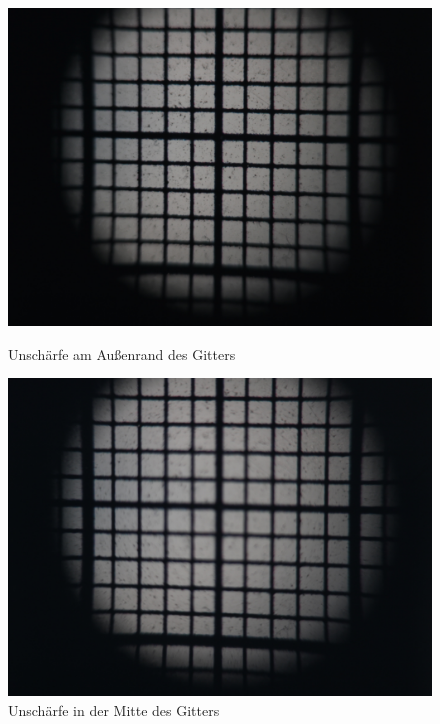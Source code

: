 \begin{figure}[h!]
	\begin{minipage}[t]{0.48\textwidth}
		\includegraphics[width=\linewidth]{img/Bildwoelbung/Prakt_Linsenfehler_2015_06_04_074}
		\caption{Unschärfe am Außenrand des Gitters}
		\label{fig:bildwoelbung_aussen}
	\end{minipage}
	\hfill
	\begin{minipage}[t]{0.48\textwidth}
		\includegraphics[width=\linewidth]{img/Bildwoelbung/Prakt_Linsenfehler_2015_06_04_075}
		\caption{Unschärfe in der Mitte des Gitters}
		\label{fig:bildwoelbung_mitte}
	\end{minipage}
\end{figure}

